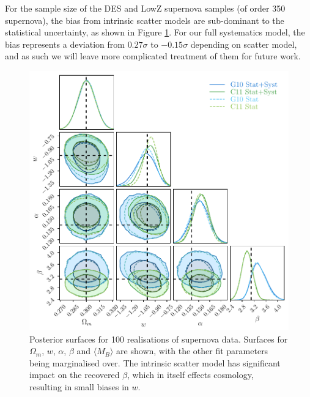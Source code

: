 \documentclass[a4paper,fleqn,usenatbib]{mnras}
\begin{document}
For the sample size of the DES and LowZ supernova samples (of order 350 supernova), the bias from intrinsic scatter models are sub-dominant to the statistical uncertainty, as shown in Figure \ref{fig:bulk_posterior}. For our full systematics model, the bias represents a deviation from $0.27\sigma$ to $-0.15\sigma$ depending on scatter model, and as such we will leave more complicated treatment of them for future work.

\begin{figure}
	\begin{center}
		\includegraphics[width=\columnwidth]{bulk_small2.pdf}
	\end{center}
	\caption{Posterior surfaces for 100 realisations of supernova data. Surfaces for $\Omega_m$, $w$, $\alpha$, $\beta$ and $\langle M_B \rangle$ are shown, with the other fit parameters being marginalised over. The intrinsic scatter model has significant impact on the recovered $\beta$, which in itself effects cosmology, resulting in small biases in $w$.}
	\label{fig:bulk_posterior}
\end{figure}
\end{document}
